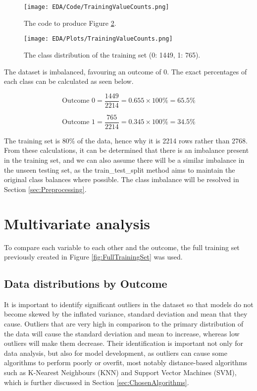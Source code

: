 \begin{figure}[H]
    \centering
    \texttt{[image: EDA/Code/TrainingValueCounts.png]}
    \caption{The code to produce Figure \ref{fig:ClassImbalancePlot}.}
    \label{fig:ClassImbalancePlotCode}
\end{figure}

\begin{figure}[H]
    \centering
    \texttt{[image: EDA/Plots/TrainingValueCounts.png]}
    \caption{The class distribution of the training set (0: 1449, 1: 765).}
    \label{fig:ClassImbalancePlot}
\end{figure}

\para The dataset is imbalanced, favouring an outcome of 0. The exact percentages 
of each class can be calculated as seen below.

\begin{equation}
    \text{Outcome 0} = \frac{1449}{2214} = 0.655 \times 100\% = 65.5\%
\end{equation}

\begin{equation}
    \text{Outcome 1} = \frac{765}{2214} = 0.345 \times 100\% = 34.5\%
\end{equation}

\para The training set is 80\% of the data, hence why it is 2214 rows rather than 2768. From these calculations, it can be determined that 
there is an imbalance present in the training set, and we can also assume there will be a similar imbalance in the unseen testing set, as the train\_test\_split method 
aims to maintain the original class balances where possible. The class imbalance will be resolved in Section \ref{sec:Preprocessing}.



\section{Multivariate analysis}
To compare each variable to each other and the outcome, the full training set previously  
created in Figure \ref{fig:FullTrainingSet} was used.

\subsection{Data distributions by Outcome}

It is important to identify significant outliers in the dataset so that models do not become skewed by the inflated variance, standard 
deviation and mean that they cause. Outliers that are very high in comparison to the primary distribution of the data will cause the 
standard deviation and mean to increase, whereas low outliers will make them decrease. Their identification is important not only for data analysis, 
but also for model development, as outliers can cause some algorithms to perform poorly or overfit, most notably distance-based algorithms 
such as K-Nearest Neighbours (KNN) and Support Vector Machines (SVM), which is further discussed in Section \ref{sec:ChosenAlgorithms}. 

